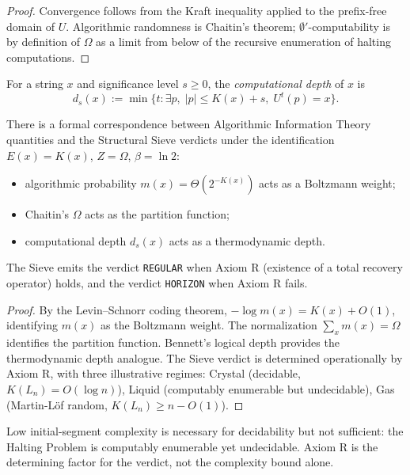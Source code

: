 \begin{proof}
Convergence follows from the Kraft inequality applied to the prefix-free domain of $U$. Algorithmic randomness is Chaitin's theorem; $\emptyset'$-computability is by definition of $\Omega$ as a limit from below of the recursive enumeration of halting computations.
\end{proof}

\begin{definition}\label{def-computational-depth}
For a string $x$ and significance level $s \ge 0$, the \emph{computational depth} of $x$ is
\[
d_s(x) := \min\bigl\{ t : \exists p,\; |p| \le K(x) + s,\; U^t(p) = x \bigr\}.
\]
\end{definition}

\begin{theorem}\label{thm-sieve-thermo}
There is a formal correspondence between Algorithmic Information Theory quantities and the Structural Sieve verdicts under the identification $E(x) = K(x)$, $Z = \Omega$, $\beta = \ln 2$:
\begin{itemize}
\item algorithmic probability $m(x) = \Theta(2^{-K(x)})$ acts as a Boltzmann weight;
\item Chaitin's $\Omega$ acts as the partition function;
\item computational depth $d_s(x)$ acts as a thermodynamic depth.
\end{itemize}
The Sieve emits the verdict \texttt{REGULAR} when Axiom R (existence of a total recovery operator) holds, and the verdict \texttt{HORIZON} when Axiom R fails.
\end{theorem}

\begin{proof}
By the Levin--Schnorr coding theorem, $-\log m(x) = K(x) + O(1)$, identifying $m(x)$ as the Boltzmann weight. The normalization $\sum_x m(x) = \Omega$ identifies the partition function. Bennett's logical depth provides the thermodynamic depth analogue. The Sieve verdict is determined operationally by Axiom R, with three illustrative regimes: Crystal (decidable, $K(L_n) = O(\log n)$), Liquid (computably enumerable but undecidable), Gas (Martin-L\"of random, $K(L_n) \ge n - O(1)$).
\end{proof}

\begin{remark}\label{rem-axiom-r}
Low initial-segment complexity is necessary for decidability but not sufficient: the Halting Problem is computably enumerable yet undecidable. Axiom R is the determining factor for the verdict, not the complexity bound alone.
\end{remark}

